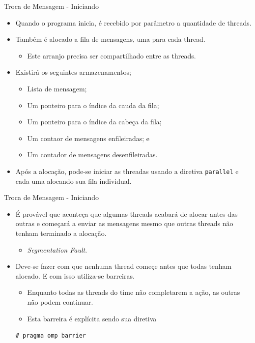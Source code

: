 	\begin{frame}{Troca de Mensagem -  Iniciando}
		\begin{itemize}
			\item Quando o programa inicia, é recebido por parâmetro a quantidade de threads.
			\item Também é alocado a fila de mensagens, uma para cada thread.
			\begin{itemize}
				\item Este arranjo precisa ser compartilhado entre as threads.
			\end{itemize}
			\item Existirá os seguintes armazenamentos;
			\begin{itemize}
				\item Lista de mensagem;
				\item Um ponteiro para o índice da cauda da fila;
				\item Um ponteiro para o índice da cabeça da fila;
				\item Um contaor de mensagens enfileiradas; e
				\item Um contador de mensagens desenfileiradas.
			\end{itemize}
			\item Após a alocação, pode-se iniciar as threadas usando a diretiva {\tt parallel} e cada uma alocando sua fila individual.
		\end{itemize}
	\end{frame}

	\begin{frame}{Troca de Mensagem -  Iniciando}
		\begin{itemize}
			\item É provável que aconteça que algumas threads acabará de alocar antes das outras e começará a enviar as mensagens mesmo que outras threads não tenham terminado a alocação.
			\begin{itemize}
				\item \textit{Segmentation Fault}.
			\end{itemize}
			\item Deve-se fazer com que nenhuma thread começe antes que todas tenham alocado. E com isso utiliza-se barreiras.
			\begin{itemize}
				\item Enquanto todas as threads do time não completarem a ação, as outras não podem continuar.
				\item Esta barreira é explícita sendo sua diretiva
			\end{itemize}
			{\tt \#	pragma omp barrier}
		\end{itemize}
	\end{frame}

